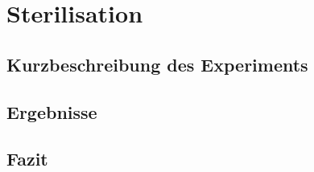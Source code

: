\section{Sterilisation}

\subsection{Kurzbeschreibung des Experiments}

\subsection{Ergebnisse}

\subsection{Fazit}
